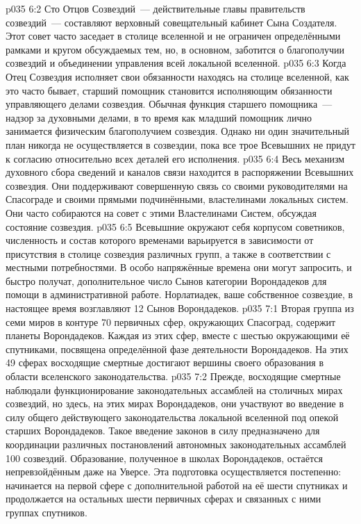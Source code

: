 \vs p035 6:2 Сто Отцов Созвездий~--- действительные главы правительств созвездий~--- составляют верховный совещательный кабинет Сына Создателя. Этот совет часто заседает в столице вселенной и не ограничен определёнными рамками и кругом обсуждаемых тем, но, в основном, заботится о благополучии созвездий и объединении управления всей локальной вселенной.
\vs p035 6:3 Когда Отец Созвездия исполняет свои обязанности находясь на столице вселенной, как это часто бывает, старший помощник становится исполняющим обязанности управляющего делами созвездия. Обычная функция старшего помощника~--- надзор за духовными делами, в то время как младший помощник лично занимается физическим благополучием созвездия. Однако ни один значительный план никогда не осуществляется в созвездии, пока все трое Всевышних не придут к согласию относительно всех деталей его исполнения.
\vs p035 6:4 Весь механизм духовного сбора сведений и каналов связи находится в распоряжении Всевышних созвездия. Они поддерживают совершенную связь со своими руководителями на Спасограде и своими прямыми подчинёнными, властелинами локальных систем. Они часто собираются на совет с этими Властелинами Систем, обсуждая состояние созвездия.
\vs p035 6:5 Всевышние окружают себя корпусом советников, численность и состав которого временами варьируется в зависимости от присутствия в столице созвездия различных групп, а также в соответствии с местными потребностями. В особо напряжённые времена они могут запросить, и быстро получат, дополнительное число Сынов категории Ворондадеков для помощи в административной работе. Норлатиадек, ваше собственное созвездие, в настоящее время возглавляют 12 Сынов Ворондадеков.
\vs p035 7:1 Вторая группа из семи миров в контуре 70 первичных сфер, окружающих Спасоград, содержит планеты Ворондадеков. Каждая из этих сфер, вместе с шестью окружающими её спутниками, посвящена определённой фазе деятельности Ворондадеков. На этих 49 сферах восходящие смертные достигают вершины своего образования в области вселенского законодательства.
\vs p035 7:2 Прежде, восходящие смертные наблюдали функционирование законодательных ассамблей на столичных мирах созвездий, но здесь, на этих мирах Ворондадеков, они участвуют во введение в силу общего действующего законодательства локальной вселенной под опекой старших Ворондадеков. Такое введение законов в силу предназначено для координации различных постановлений автономных законодательных ассамблей 100 созвездий. Образование, полученное в школах Ворондадеков, остаётся непревзойдённым даже на Уверсе. Эта подготовка осуществляется постепенно: начинается на первой сфере с дополнительной работой на её шести спутниках и продолжается на остальных шести первичных сферах и связанных с ними группах спутников.
